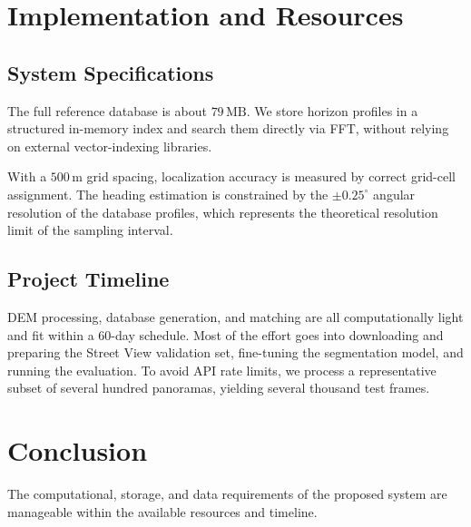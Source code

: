 \section{Implementation and Resources}

\subsection{System Specifications}
The full reference database is about $79\,\text{MB}$. We store horizon profiles in a structured in-memory index and search them directly via FFT, without relying on external vector-indexing libraries.

With a $500\,\text{m}$ grid spacing, localization accuracy is measured by correct grid-cell assignment. The heading estimation is constrained by the $\pm 0.25^{\circ}$ angular resolution of the database profiles, which represents the theoretical resolution limit of the sampling interval.

\subsection{Project Timeline}
DEM processing, database generation, and matching are all computationally light and fit within a 60-day schedule. Most of the effort goes into downloading and preparing the Street View validation set, fine-tuning the segmentation model, and running the evaluation. To avoid API rate limits, we process a representative subset of several hundred panoramas, yielding several thousand test frames.

\section{Conclusion}
The computational, storage, and data requirements of the proposed system are manageable within the available resources and timeline.
